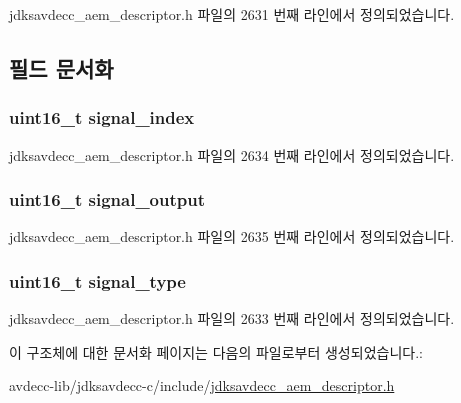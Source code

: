 jdksavdecc\+\_\+aem\+\_\+descriptor.\+h 파일의 2631 번째 라인에서 정의되었습니다.



\subsection{필드 문서화}
\subsubsection[{\texorpdfstring{signal\+\_\+index}{signal_index}}]{\setlength{\rightskip}{0pt plus 5cm}uint16\+\_\+t signal\+\_\+index}\hypertarget{structjdksavdecc__mixer__source_ae2e81a95ee9ad83f1fe22b6a1ee29075}{}\label{structjdksavdecc__mixer__source_ae2e81a95ee9ad83f1fe22b6a1ee29075}


jdksavdecc\+\_\+aem\+\_\+descriptor.\+h 파일의 2634 번째 라인에서 정의되었습니다.

\subsubsection[{\texorpdfstring{signal\+\_\+output}{signal_output}}]{\setlength{\rightskip}{0pt plus 5cm}uint16\+\_\+t signal\+\_\+output}\hypertarget{structjdksavdecc__mixer__source_ab4b91864e6fc335d7e86536d9f4461e4}{}\label{structjdksavdecc__mixer__source_ab4b91864e6fc335d7e86536d9f4461e4}


jdksavdecc\+\_\+aem\+\_\+descriptor.\+h 파일의 2635 번째 라인에서 정의되었습니다.

\subsubsection[{\texorpdfstring{signal\+\_\+type}{signal_type}}]{\setlength{\rightskip}{0pt plus 5cm}uint16\+\_\+t signal\+\_\+type}\hypertarget{structjdksavdecc__mixer__source_a248e60ef99d5ed1779989d1dd6b6dc5a}{}\label{structjdksavdecc__mixer__source_a248e60ef99d5ed1779989d1dd6b6dc5a}


jdksavdecc\+\_\+aem\+\_\+descriptor.\+h 파일의 2633 번째 라인에서 정의되었습니다.



이 구조체에 대한 문서화 페이지는 다음의 파일로부터 생성되었습니다.\+:\begin{DoxyCompactItemize}
\item 
avdecc-\/lib/jdksavdecc-\/c/include/\hyperlink{jdksavdecc__aem__descriptor_8h}{jdksavdecc\+\_\+aem\+\_\+descriptor.\+h}\end{DoxyCompactItemize}
